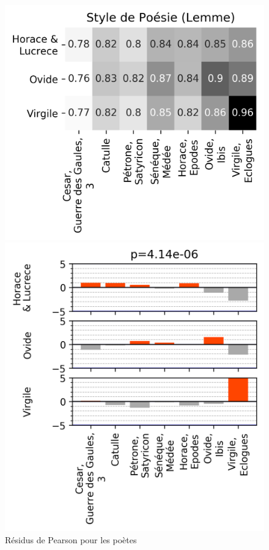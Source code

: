 \begin{figure}
    \begin{minipage}[c]{0.40\linewidth}
        \includegraphics[width=0.95\linewidth]{results/lemmatisation/longreeVariante/LongreeVariante-AccuracyStyleDePoesie-Lemme.png}
    \end{minipage} \hfill
    \begin{minipage}[c]{0.58\linewidth}
        \includegraphics[width=0.95\linewidth]{results/lemmatisation/longreeVariante/LongreeVariante-AssocPlotStyleDePoesie-Lemme.png}
    \end{minipage}
    \caption{Résidus de Pearson pour les poètes}
    \label{fig:lemmatisation:longree:poetes}
\end{figure}

